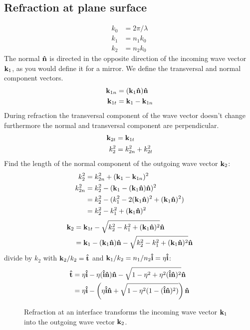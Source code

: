 \documentclass[twocolumn,DIV19]{scrartcl}
\begin{document}
\subsection{Refraction at plane surface}
\begin{align}
  k_0&=2\pi/\lambda\\
  k_1&=n_1 k_0\\
  k_2&=n_2 k_0
\end{align}
The normal $\mathbf{\hat{n}}$ is directed in the opposite direction of the incoming
wave vector $\mathbf{k}_1$, as you would define it for a mirror. We define the
transversal and normal component vectors.
\begin{align}
  \mathbf{k}_{1n}&=(\mathbf{k}_1\mathbf{\hat{n}})\mathbf{\hat{n}}\\ 
  \mathbf{k}_{1t}&=\mathbf{k}_1 - \mathbf{k}_{1n}
\end{align}
During refraction the transversal component of the wave vector doesn't
change furthermore the normal and transversal component are
perpendicular.
\begin{align}
  \mathbf{k}_{2t}&=\mathbf{k}_{1t}\\
  k_2^2&=k_{2n}^2 + k_{2t}^2
\end{align}
Find the length of the normal component of the outgoing wave vector $\mathbf{k}_2$:
\begin{align}
  k_2^2&=k_{2n}^2 + (\mathbf{k}_1 - \mathbf{k}_{1n})^2\\
  k_{2n}^2&=k_2^2-(\mathbf{k}_1-(\mathbf{k}_1\mathbf{\hat{n}})\mathbf{\hat{n}})^2\\
  &= k_2^2-(k_1^2-2(\mathbf{k}_1\mathbf{\hat{n}})^2+(\mathbf{k}_1\mathbf{\hat{n}})^2)\\
  &= k_2^2-k_1^2+(\mathbf{k}_1\mathbf{\hat{n}})^2
\end{align}
\begin{align}
  \mathbf{k}_2&=\mathbf{k}_{1t}-\sqrt{k_2^2-k_1^2+(\mathbf{k}_1\mathbf{\hat{n}})^2}\mathbf{\hat{n}}\\
  &=\mathbf{k}_1-(\mathbf{k}_1\mathbf{\hat{n}})\mathbf{\hat{n}}-\sqrt{k_2^2-k_1^2+(\mathbf{k}_1\mathbf{\hat{n}})^2}\mathbf{\hat{n}}
\end{align}
divide by $k_2$ with $\mathbf{k}_2/k_2=\mathbf{\hat{t}}$ and $\mathbf{k}_1/k_2=n_1/n_2\mathbf{\hat{i}}=\eta\mathbf{\hat{i}}$:
\begin{align}
  \mathbf{\hat{t}}&=\eta\mathbf{\hat{i}}-\eta(\mathbf{\hat{i}}\mathbf{\hat{n}})\mathbf{\hat{n}}-\sqrt{1-\eta^2+\eta^2(\mathbf{\hat{i}}\mathbf{\hat{n}})^2}\mathbf{\hat{n}}\\
  &=\eta\mathbf{\hat{i}}-\left(\eta\mathbf{\hat{i}}\mathbf{\hat{n}}+\sqrt{1-\eta^2(1-(\mathbf{\hat{i}}\mathbf{\hat{n}})^2)}\right)\mathbf{\hat{n}}
\end{align}
 \begin{figure}
   \centering
   
   \caption{Refraction at an interface transforms the incoming wave
     vector $\mathbf{k}_1$ into the outgoing wave vector $\mathbf{k}_2$.}
 \end{figure}
\end{document}
